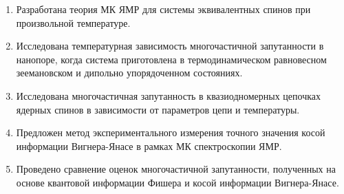 \begin{enumerate}
  \item 
  Разработана теория МК ЯМР для системы эквивалентных спинов при произвольной температуре.
  
  \item 
  Исследована температурная зависимость многочастичной запутанности в нанопоре, 
  когда система приготовлена в термодинамическом равновесном зеемановском и дипольно упорядоченном состояниях.
  
  \item
  Исследована многочастичная запутанность в квазиодномерных цепочках ядерных спинов в зависимости от параметров цепи и температуры.
  
  \item 
  Предложен метод экспериментального измерения точного значения косой информации Вигнера-Янасе в рамках МК спектроскопии ЯМР.
  
  \item 
  Проведено сравнение оценок многочастичной запутанности, полученных на основе квантовой информации Фишера и косой информации Вигнера-Янасе.
\end{enumerate}